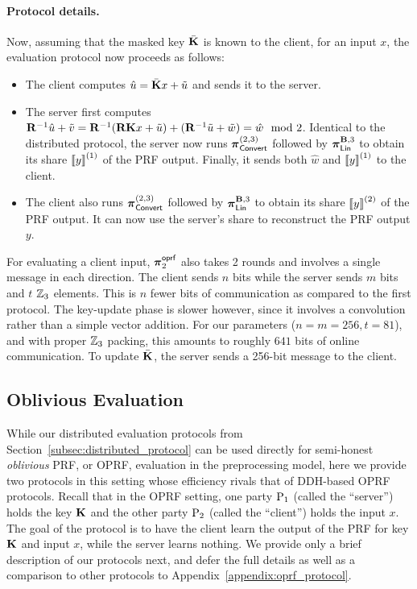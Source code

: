 \paragraph{Protocol details.} Now, assuming that the masked key $\bar{\mat{K}}$ is known to the client, for an input $x$,  the evaluation protocol now proceeds as follows:
\begin{itemize}
  \item The client computes $\hat{u} = \bar{\mat{K}}x + \tilde{u}$ and sends it to the server.

  \item The server first computes $\mat{R}^{-1}\hat{u} + \tilde{v} = \mat{R}^{-1}(\mat{R}\mat{K}x + \tilde{u}) + (\mat{R}^{-1}\tilde{u} + \tilde{w}) = \hat{w} \mod 2$. Identical to the distributed protocol, the server now runs $\boldsymbol{\pi}_{\textnormal{\textsf{Convert}}}^{(2,3)}$ followed by $\prot_\LMap^{\mat{B},3}$ to obtain its share $\left\llbracket y \right\rrbracket^{(1)}$ of the PRF output. Finally, it sends both $\hat{w}$ and $\left\llbracket y \right\rrbracket^{(1)}$ to the client.

  \item The client also runs $\boldsymbol{\pi}_{\textnormal{\textsf{Convert}}}^{(2,3)}$ followed by $\prot_\LMap^{\mat{B},3}$ to obtain its share $\left\llbracket y \right\rrbracket^{(2)}$ of the PRF output. It can now use the server's share to reconstruct the PRF output $y$.
\end{itemize}
For evaluating a client input, $\boldsymbol{\pi}^{\textsf{oprf}}_2$ also takes 2 rounds and involves a single message in each direction. The client sends $n$ bits while the server sends $m$ bits and $t$ $\mathbb{Z}_3$ elements. This is $n$ fewer bits of communication as compared to the first protocol. The key-update phase is slower however, since it involves a convolution rather than a simple vector addition. For our parameters ($n=m=256, t=81$), and with proper $\mathbb{Z}_3$ packing, this amounts to roughly $641$ bits of online communication. To update $\bar{\mat{K}}$, the server sends a 256-bit message to the client.
\else

\subsection{Oblivious Evaluation}
\label{subsec:oprf_protocol}
While our distributed evaluation protocols from Section~\ref{subsec:distributed_protocol} can be used directly for semi-honest \textit{oblivious} PRF, or OPRF, evaluation in the preprocessing model, here we provide two protocols in this setting whose efficiency rivals that of DDH-based OPRF protocols. Recall that in the OPRF setting, one party $\textnormal{P}_1$ (called the ``server'') holds the key $\mat{K}$ and the other party $\textnormal{P}_2$ (called the ``client'') holds the input $x$. The goal of the protocol is to have the client learn the output of the PRF for key $\mat{K}$ and input $x$, while the server learns nothing. We provide only a brief description of our protocols next, and defer the full details as well as a comparison to other protocols to Appendix~\ref{appendix:oprf_protocol}.

